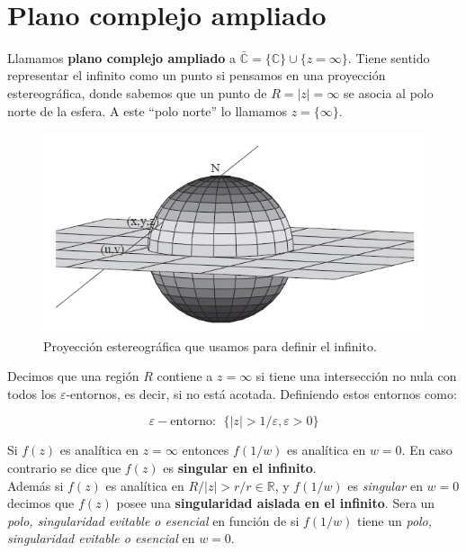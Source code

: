 \documentclass[12pt]{book}
\begin{document}
\hrulefill \\

\section{Plano complejo ampliado}


Llamamos \textbf{plano complejo ampliado} a $\bar{\mathbb{C}} = \{ \mathbb{C} \} \cup \{  z = \infty \}$. Tiene sentido representar el infinito como un punto si pensamos en una proyección estereográfica, donde sabemos que un punto de $R=|z|=\infty$ se asocia al polo norte de la esfera. A este ``polo norte'' lo llamamos $z=\{ \infty \}$.\\

\begin{figure}[h!] \centering
\includegraphics[scale=0.5]{proyeccionestereografica.png}
\caption{Proyección estereográfica que usamos para definir el infinito.}
\end{figure}
 
Decimos que una región $R$ contiene a $z = \infty$ si tiene una intersección no nula con todos los $\varepsilon$-entornos, es decir, si no está acotada. Definiendo estos entornos como:

\begin{equation}
\varepsilon - \mathrm{entorno:} \ \ \{ |z|>1/\varepsilon, \varepsilon>0 \}
\end{equation}


Si $f(z)$ es analítica en $z=\infty$ entonces $f(1/w)$ es analítica en $w=0$. En caso contrario se dice que $f(z)$ es \textbf{singular en el infinito}. \\

Además si $f(z)$ es analítica en $R / |z| > r / r \in \mathbb{R}$, y $f(1/w)$ es \textit{singular} en $w=0$ decimos que $f(z)$ posee una \textbf{singularidad aislada en el infinito}. Sera un  \textit{polo, singularidad evitable o esencial} en función de si $f(1/w)$ tiene un \textit{polo, singularidad evitable o esencial} en $w=0$. \\
\end{document}
